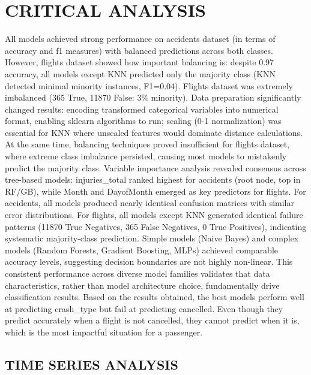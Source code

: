 \documentclass[10pt]{extarticle}
\begin{document}
\section{CRITICAL ANALYSIS}
{All models achieved strong performance on accidents dataset (in terms of accuracy and f1 measures) with balanced predictions across both classes. However, flights dataset showed how important balancing is: despite 0.97 accuracy, all models except KNN predicted only the majority class (KNN detected minimal minority instances, F1=0.04). Flights dataset was extremely imbalanced (365 True, 11870 False: 3\% minority). Data preparation significantly changed results: encoding transformed categorical variables into numerical format, enabling sklearn algorithms to run; scaling (0-1 normalization) was essential for KNN where unscaled features would dominate distance calculations. At the same time, balancing techniques proved insufficient for flights dataset, where extreme class imbalance persisted, causing most models to mistakenly predict the majority class. Variable importance analysis revealed consensus across tree-based models: injuries\_total ranked highest for accidents (root node, top in RF/GB), while Month and DayofMonth emerged as key predictors for flights. For accidents, all models produced nearly identical confusion matrices with similar error distributions. For flights, all models except KNN generated identical failure patterns (11870 True Negatives, 365 False Negatives, 0 True Positives), indicating systematic majority-class prediction. Simple models (Naive Bayes) and complex models (Random Forests, Gradient Boosting, MLPs) achieved comparable accuracy levels, suggesting decision boundaries are not highly non-linear. This consistent performance across diverse model families validates that data characteristics, rather than model architecture choice, fundamentally drive classification results. Based on the results obtained, the best models perform well at predicting crash\_type but fail at predicting cancelled. Even though they predict accurately when a flight is not cancelled, they cannot predict when it is, which is the most impactful situation for a passenger.}

\begin{center}
	\section*{\fontsize{0.75cm}{1cm}\selectfont TIME SERIES ANALYSIS}
\end{center}
\end{document}

